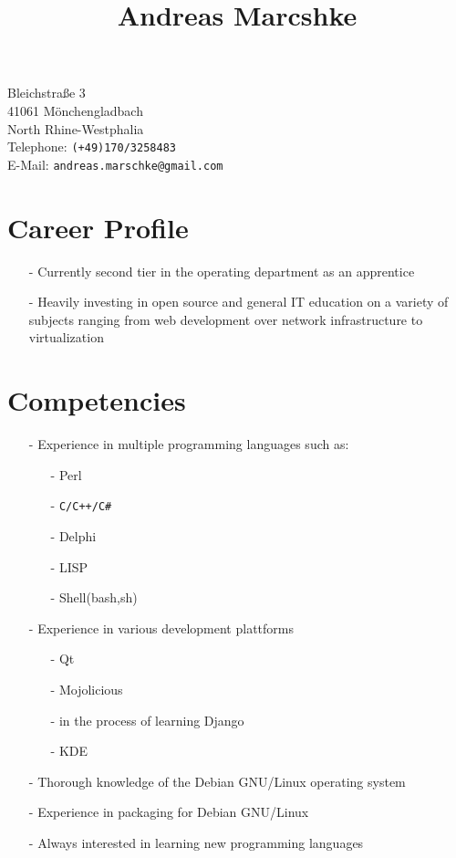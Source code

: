 \documentclass[11pt]{article}
\title{Andreas Marcshke}
\date{}
\begin{document}
\maketitle

Bleichstraße 3 \\
41061 Mönchengladbach \\
North Rhine-Westphalia \\
Telephone: \texttt{(+49)170/3258483} \\
E-Mail: \texttt{andreas.marschke@gmail.com}


\section*{Career Profile}

\begin{itemize}
  \item[-] Currently second tier in the operating department as an apprentice
  \item[-] Heavily investing in open source and general IT education
    on a variety of subjects ranging from web development over network
    infrastructure to virtualization
\end{itemize}

\section*{Competencies}

\begin{itemize}
  \item[-] Experience in multiple programming languages such as:
    \begin{itemize}
      \item[-] Perl
      \item[-] \verb*|C/C++/C#|
      \item[-] Delphi
      \item[-] LISP
      \item[-] Shell(bash,sh)
    \end{itemize}

  \item[-] Experience in various development plattforms
    \begin{itemize}
      \item[-] Qt
      \item[-] Mojolicious
      \item[-] in the process of learning Django
      \item[-] KDE
    \end{itemize}
  \item[-] Thorough knowledge of the Debian GNU/Linux operating
    system
  \item[-] Experience in packaging for Debian GNU/Linux
  \item[-] Always interested in learning new programming
    languages
\end{itemize}
\end{document}
